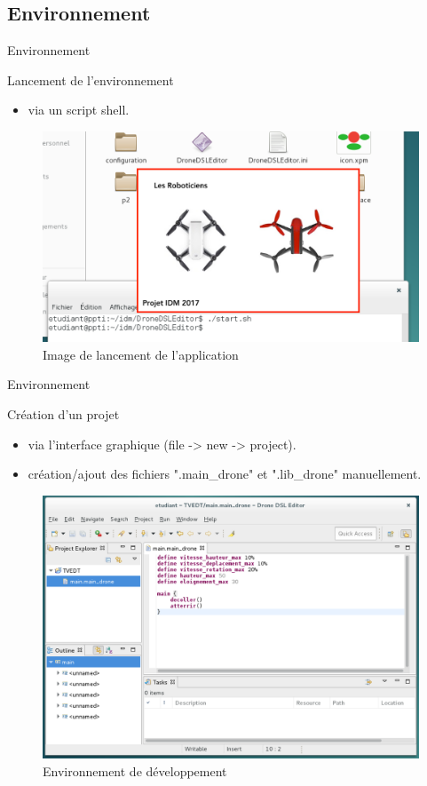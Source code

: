 \documentclass{bredelebeamer}
\begin{document}
	\subsection{Environnement}
\begin{frame}{Environnement}
\begin{block}{Lancement de l'environnement}
\begin{itemize}
\item via un script shell.
\end{itemize}
\end{block}\pause
\begin{figure}
\centering
\includegraphics[scale=0.15]{images/IDE00.png}
\caption{Image de lancement de l'application}
\end{figure}
\end{frame}

\begin{frame}{Environnement}
\begin{block}{Création d'un projet}
\begin{itemize}
\item via l'interface graphique (file -> new -> project).
\item création/ajout des fichiers ".main\_drone" et ".lib\_drone" manuellement.
\end{itemize}
\end{block}
\begin{figure}
\centering
\includegraphics[scale=0.21]{images/IDE01.png}
\caption{Environnement de développement}
\end{figure}
\end{frame}
\end{document}
